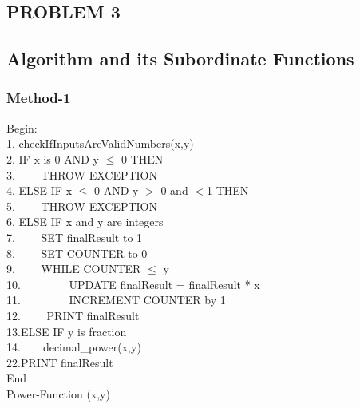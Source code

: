 \documentclass[a4paper,12pt]{article}
\begin{document}
\newpage

\begin{center}
    \chapter{\Large\textbf{PROBLEM 3}}
\end{center}

\section{Algorithm and its Subordinate Functions}
    \subsection{Method-1}
        \begin{algorithm}[H]
        Begin: \\
        1. checkIfInputsAreValidNumbers(x,y)\\
        2. IF x is 0 AND y $\leq$ 0 THEN \\
        3. $\hspace{2em}$THROW EXCEPTION \\
        4. ELSE IF x $\leq$ 0 AND y $>$ 0 and $<$1 THEN \\
        5. $\hspace{2em}$THROW EXCEPTION \\
        6. ELSE IF x and y are integers\\
        7. $\hspace{2em}$SET finalResult to 1 \\
        8. $\hspace{2em}$SET COUNTER to 0\\
        9. $\hspace{2em}$WHILE COUNTER $\leq$ y \\
        10.$\hspace{4em}$ UPDATE finalResult = finalResult * x\\
        11.$\hspace{4em}$ INCREMENT COUNTER by 1\\
        12.$\hspace{2em}$ PRINT finalResult \\
        13.ELSE IF y is fraction\\
        14.$\hspace{2em}$decimal\_power(x,y)\\
        22.PRINT finalResult \\
        End\\

        \caption{Power-Function (x,y)}
        \end{algorithm}
       
\end{document}
